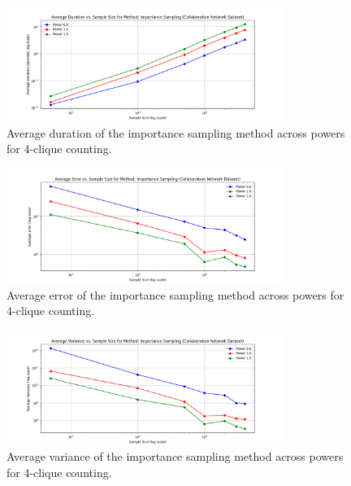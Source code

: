 \documentclass[11pt]{article}
\begin{document}
\begin{figure}[H]
    \centering
    \includegraphics[width=0.8\textwidth]{plots/4-clique/importance-sampling/avg_duration_Importance Sampling.png}
    \caption{Average duration of the importance sampling method across powers for 4-clique counting.}
    \label{fig:4_clique_avg_duration_importance_sampling}
\end{figure}

\begin{figure}[H]
    \centering
    \includegraphics[width=0.8\textwidth]{plots/4-clique/importance-sampling/avg_error_Importance Sampling.png}
    \caption{Average error of the importance sampling method across powers for 4-clique counting.}
    \label{fig:4_clique_avg_error_importance_sampling}
\end{figure}

\begin{figure}[H]
    \centering
    \includegraphics[width=0.8\textwidth]{plots/4-clique/importance-sampling/avg_variance_Importance Sampling.png}
    \caption{Average variance of the importance sampling method across powers for 4-clique counting.}
    \label{fig:4_clique_avg_variance_importance_sampling}
\end{figure}
\end{document}

